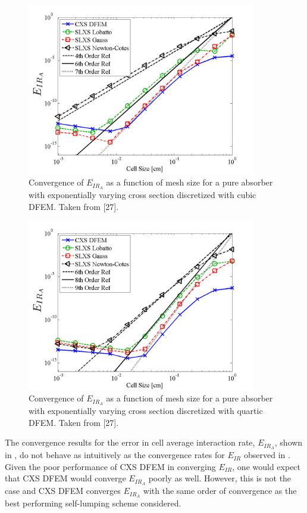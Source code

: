 \begin{figure}[!htp]
\centering
\includegraphics[width=10cm]{chapter3_variable_xs/P3_VarXS_E_I_A.png}
\caption{Convergence of $E_{IR_A}$ as a function of mesh size for a pure absorber with exponentially varying cross section discretized with cubic DFEM.  Taken from [27].}
\label{fig:varxs_I_A_p3}
\end{figure}
\begin{figure}[!hbp]
\centering
\includegraphics[width=10cm]{chapter3_variable_xs/P4_VarXS_E_I_A.png}
\caption{Convergence of $E_{IR_A}$  as a function of mesh size for a pure absorber with exponentially varying cross section discretized with quartic DFEM.  Taken from [27].}
\label{fig:varxs_I_A_p4}
\end{figure}
The convergence results for the error in cell average interaction rate, $E_{IR_A}$, shown in , do not behave as intuitively as the convergence rates for $E_{IR}$ observed in .  
Given the poor performance of CXS DFEM in converging $E_{IR}$, one would expect that CXS DFEM would converge $E_{IR_A}$ poorly as well.  
However, this is not the case and CXS DFEM converges $E_{IR_A}$ with the same order of convergence as the best performing self-lumping scheme considered.

